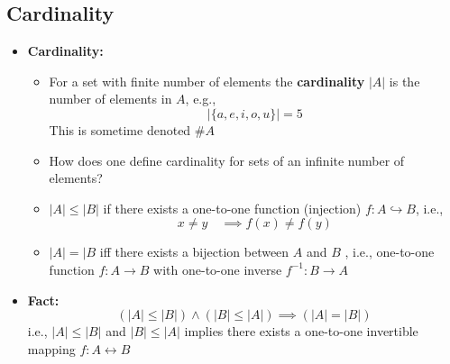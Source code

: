 \documentclass[11pt,twoside]{report}
\begin{document}
\subsection{Cardinality} 
\begin{itemize}


\item \textbf{Cardinality:} 
\begin{itemize}

\item For a set with finite number of elements the \textbf{cardinality}  $|A|$ is the number of elements in $A$, e.g., 
\[
| \{a, e, i, o, u\} | = 5
\]
This is sometime denoted $\# A$
\item How does one define cardinality for sets of an infinite number of elements?  

\item  $|A| \le  |B|$ if  there exists a one-to-one function (injection) $f \colon  A \hookrightarrow B$, i.e., 
\[
x \ne  y \quad \implies f(x) \ne f(y) 
\]
\item  $|A| = |B$ iff there exists a bijection between $A$ and $B$ , i.e., one-to-one function $f \colon A \to B$ with one-to-one  inverse $f^{-1} \colon B \to A$
        \end{itemize} 
        
        
\item \textbf{Fact:} 
\[ 
(|A|\le |B|) \wedge (|B| \le |A|) \implies (|A| = |B|)
 \]
 i.e., $|A|\le  |B|$ and $|B | \le | A|$ implies there exists a one-to-one invertible mapping $f\colon  A \leftrightarrow B$

%          
      

\end{itemize}
\end{document}
